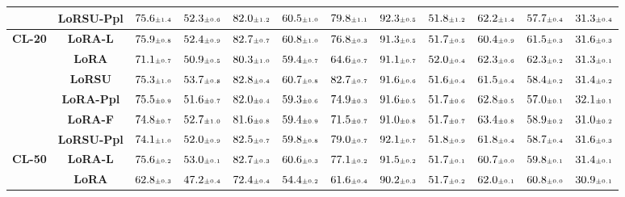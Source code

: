 \begin{table}
\begin{center}
\begin{small}
\begin{tabular}{l c c c c c c c c c c c}
& \textbf{LoRSU-Ppl} & $75.6 \mtiny{\pm 1.4}$ & $52.3 \mtiny{\pm 0.6}$ & $82.0 \mtiny{\pm 1.2}$ & $60.5 \mtiny{\pm 1.0}$ & $79.8 \mtiny{\pm 1.1}$ & $92.3 \mtiny{\pm 0.5}$ & $51.8 \mtiny{\pm 1.2}$ & $62.2 \mtiny{\pm 1.4}$ & $57.7 \mtiny{\pm 0.4}$ & $31.3 \mtiny{\pm 0.4}$ \\
\midrule
\multirow{6}{*}{\textbf{CL-20}} & \textbf{LoRA-L} & $75.9 \mtiny{\pm 0.8}$ & $52.4 \mtiny{\pm 0.9}$ & $82.7 \mtiny{\pm 0.7}$ & $60.8 \mtiny{\pm 1.0}$ & $76.8 \mtiny{\pm 0.3}$ & $91.3 \mtiny{\pm 0.5}$ & $51.7 \mtiny{\pm 0.5}$ & $60.4 \mtiny{\pm 0.9}$ & $61.5 \mtiny{\pm 0.3}$ & $31.6 \mtiny{\pm 0.3}$ \\
& \textbf{LoRA} & $71.1 \mtiny{\pm 0.7}$ & $50.9 \mtiny{\pm 0.5}$ & $80.3 \mtiny{\pm 1.0}$ & $59.4 \mtiny{\pm 0.7}$ & $64.6 \mtiny{\pm 0.7}$ & $91.1 \mtiny{\pm 0.7}$ & $52.0 \mtiny{\pm 0.4}$ & $62.3 \mtiny{\pm 0.6}$ & $62.3 \mtiny{\pm 0.2}$ & $31.3 \mtiny{\pm 0.1}$ \\
& \textbf{LoRSU} & $75.3 \mtiny{\pm 1.0}$ & $53.7 \mtiny{\pm 0.8}$ & $82.8 \mtiny{\pm 0.4}$ & $60.7 \mtiny{\pm 0.8}$ & $82.7 \mtiny{\pm 0.7}$ & $91.6 \mtiny{\pm 0.6}$ & $51.6 \mtiny{\pm 0.4}$ & $61.5 \mtiny{\pm 0.4}$ & $58.4 \mtiny{\pm 0.2}$ & $31.4 \mtiny{\pm 0.2}$ \\
& \textbf{LoRA-Ppl} & $75.5 \mtiny{\pm 0.9}$ & $51.6 \mtiny{\pm 0.7}$ & $82.0 \mtiny{\pm 0.4}$ & $59.3 \mtiny{\pm 0.6}$ & $74.9 \mtiny{\pm 0.3}$ & $91.6 \mtiny{\pm 0.5}$ & $51.7 \mtiny{\pm 0.6}$ & $62.8 \mtiny{\pm 0.5}$ & $57.0 \mtiny{\pm 0.1}$ & $32.1 \mtiny{\pm 0.1}$ \\
& \textbf{LoRA-F} & $74.8 \mtiny{\pm 0.7}$ & $52.7 \mtiny{\pm 1.0}$ & $81.6 \mtiny{\pm 0.8}$ & $59.4 \mtiny{\pm 0.9}$ & $71.5 \mtiny{\pm 0.7}$ & $91.0 \mtiny{\pm 0.8}$ & $51.7 \mtiny{\pm 0.7}$ & $63.4 \mtiny{\pm 0.8}$ & $58.9 \mtiny{\pm 0.2}$ & $31.0 \mtiny{\pm 0.2}$ \\
& \textbf{LoRSU-Ppl} & $74.1 \mtiny{\pm 1.0}$ & $52.0 \mtiny{\pm 0.9}$ & $82.5 \mtiny{\pm 0.7}$ & $59.8 \mtiny{\pm 0.8}$ & $79.0 \mtiny{\pm 0.7}$ & $92.1 \mtiny{\pm 0.7}$ & $51.8 \mtiny{\pm 0.9}$ & $61.8 \mtiny{\pm 0.4}$ & $58.7 \mtiny{\pm 0.4}$ & $31.6 \mtiny{\pm 0.3}$ \\
\midrule
\multirow{6}{*}{\textbf{CL-50}} & \textbf{LoRA-L} & $75.6 \mtiny{\pm 0.2}$ & $53.0 \mtiny{\pm 0.1}$ & $82.7 \mtiny{\pm 0.3}$ & $60.6 \mtiny{\pm 0.3}$ & $77.1 \mtiny{\pm 0.2}$ & $91.5 \mtiny{\pm 0.2}$ & $51.7 \mtiny{\pm 0.1}$ & $60.7 \mtiny{\pm 0.0}$ & $59.8 \mtiny{\pm 0.1}$ & $31.4 \mtiny{\pm 0.1}$ \\
& \textbf{LoRA} & $62.8 \mtiny{\pm 0.3}$ & $47.2 \mtiny{\pm 0.4}$ & $72.4 \mtiny{\pm 0.4}$ & $54.4 \mtiny{\pm 0.2}$ & $61.6 \mtiny{\pm 0.4}$ & $90.2 \mtiny{\pm 0.3}$ & $51.7 \mtiny{\pm 0.2}$ & $62.0 \mtiny{\pm 0.1}$ & $60.8 \mtiny{\pm 0.0}$ & $30.9 \mtiny{\pm 0.1}$ \\

\end{tabular}
\end{small}
\end{center}
\end{table}
